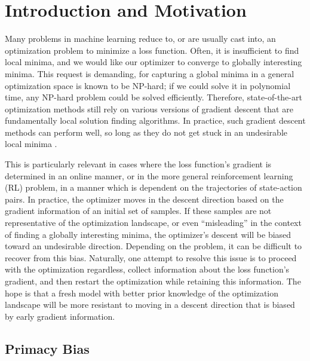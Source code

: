 \documentclass[base]{subfiles}
\begin{document}
\section{Introduction and Motivation}
\label{sec:intro}

Many problems in machine learning reduce to, or are usually cast into, an optimization problem to minimize a loss function.
Often, it is insufficient to find local minima, and we would like our optimizer to converge to globally interesting minima.
This request is demanding, for capturing a global minima in a general optimization space is known to be NP-hard; if we could solve it in polynomial time, any NP-hard problem could be solved efficiently.
Therefore, state-of-the-art optimization methods still rely on various versions of gradient descent that are fundamentally local solution finding algorithms.
In practice, such gradient descent methods can perform well, so long as they do not get stuck in an undesirable local minima \cite{jin2017accelerated}.

This is particularly relevant in cases where the loss function's gradient is determined in an online manner, or in the more general reinforcement learning (RL) problem, in a manner which is dependent on the trajectories of state-action pairs.
In practice, the optimizer moves in the descent direction based on the gradient information of an initial set of samples.
If these samples are not representative of the optimization landscape, or even \enquote{misleading} in the context of finding a globally interesting minima, the optimizer's descent will be biased toward an undesirable direction.
Depending on the problem, it can be difficult to recover from this bias.
Naturally, one attempt to resolve this issue is to proceed with the optimization regardless, collect information about the loss function's gradient, and then restart the optimization while retaining this information.
The hope is that a fresh model with better prior knowledge of the optimization landscape will be more resistant to moving in a descent direction that is biased by early gradient information.

\subsection{Primacy Bias}
\end{document}
